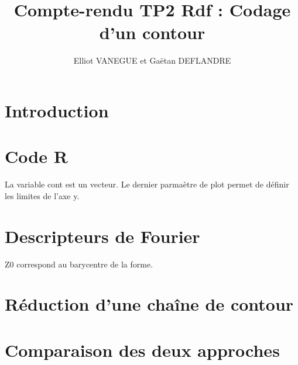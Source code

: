 \documentclass{article}
\title{Compte-rendu TP2 Rdf : Codage d'un contour}
\author{Elliot VANEGUE et Gaëtan DEFLANDRE}
\begin{document}


  \maketitle
  
  \mbox{}
  \newpage
  \clearpage
  
  \section{Introduction}
  
  \section{Code R}
  La variable cont est un vecteur.
  Le dernier parmaètre de plot permet de définir les limites de l'axe y. 
  \section{Descripteurs de Fourier}
  Z0 correspond au barycentre de la forme.
  \section{Réduction d'une chaîne de contour}
  \section{Comparaison des deux approches}
    
\end{document}
